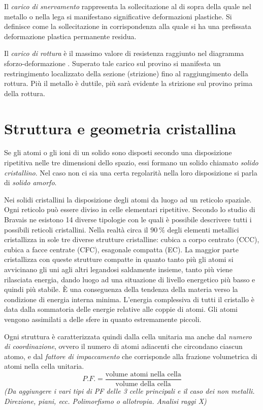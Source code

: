 \documentclass[a5paper,12pt]{article}
\newcommand{\e}{\`E\xspace}  %
\begin{document}
Il \emph{carico di snervamento} \label{snerv} rappresenta la sollecitazione al di sopra della quale nel metallo o nella lega si manifestano significative deformazioni plastiche. Si definisce come la sollecitazione in corrispondenza alla quale si ha una prefissata deformazione plastica permanente residua.

Il \emph{carico di rottura} è il massimo valore di resistenza raggiunto nel diagramma sforzo-deformazione . Superato tale carico sul provino si manifesta un restringimento localizzato della sezione (strizione) fino al raggiungimento della rottura. Più il metallo è duttile, più sarà evidente la strizione sul provino prima della rottura.
\section{Struttura e geometria cristallina}
Se gli atomi o gli ioni di un solido sono disposti secondo una disposizione ripetitiva nelle tre dimensioni dello spazio, essi formano un solido chiamato \emph{solido cristallino}. Nel caso non ci sia una certa regolarità nella loro disposizione si parla di \emph{solido amorfo}.

Nei solidi cristallini la disposizione degli atomi da luogo ad un reticolo spaziale. Ogni reticolo può essere diviso in celle elementari ripetitive. Secondo lo studio di Bravais ne esistono 14 diverse tipologie con le quali è possibile descrivere tutti i possibili reticoli cristallini. Nella realtà circa il $\SI{90}{\%}$ degli elementi metallici cristallizza in sole tre diverse strutture cristalline: cubica a corpo centrato (CCC), cubica a facce centrate (CFC), esagonale compatta (EC). La maggior parte cristallizza con queste strutture compatte in quanto tanto più gli atomi si avvicinano gli uni agli altri legandosi saldamente insieme, tanto più viene rilasciata energia, dando luogo ad una situazione di livello energetico più basso e quindi più stabile. \e una conseguenza della tendenza della materia verso la condizione di energia interna minima. L'energia complessiva di tutti il cristallo è data dalla sommatoria delle energie relative alle coppie di atomi. Gli atomi vengono assimilati a delle sfere in quanto estremamente piccoli.

Ogni struttura è caratterizzata quindi dalla cella unitaria ma anche dal \emph{numero di coordinazione}, ovvero il numero di atomi adiacenti che circondano ciascun atomo, e dal \emph{fattore di impaccamento} che corrisponde alla frazione volumetrica di atomi nella cella unitaria. \[P.F. = \frac{\text{volume atomi nella cella}}{\text{volume della cella}}\]
\textit{(Da aggiungere i vari tipi di PF delle 3 celle principali e il caso dei non metalli. Direzione, piani, ecc. Polimorfismo o allotropia. Analisi raggi X)}
\end{document}
